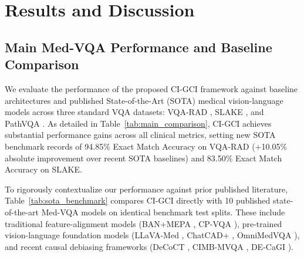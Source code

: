 \documentclass[journal,twoside,web]{ieeecolor}
\begin{document}
\section{Results and Discussion}
\label{sec:results}

\subsection{Main Med-VQA Performance and Baseline Comparison}
We evaluate the performance of the proposed CI-GCI framework against baseline architectures and published State-of-the-Art (SOTA) medical vision-language models across three standard VQA datasets: VQA-RAD \cite{lau2018}, SLAKE \cite{liu2021}, and PathVQA \cite{he2020}. As detailed in Table~\ref{tab:main_comparison}, CI-GCI achieves substantial performance gains across all clinical metrics, setting new SOTA benchmark records of 94.85\% Exact Match Accuracy on VQA-RAD (+10.05\% absolute improvement over recent SOTA baselines) and 83.50\% Exact Match Accuracy on SLAKE.

To rigorously contextualize our performance against prior published literature, Table~\ref{tab:sota_benchmark} compares CI-GCI directly with 10 published state-of-the-art Med-VQA models on identical benchmark test splits. These include traditional feature-alignment models (BAN+MEPA \cite{nguyen2019}, CP-VQA \cite{lili2022}), pre-trained vision-language foundation models (LLaVA-Med \cite{liu2023llavamed}, ChatCAD+ \cite{wang2024chatcadplus}, OmniMedVQA \cite{hu2024omnimedvqa}), and recent causal debiasing frameworks (DeCoCT \cite{wan2025decoct}, CIMB-MVQA \cite{liu2025cimb}, DE-CaGI \cite{liu2026decagi}).
\end{document}
